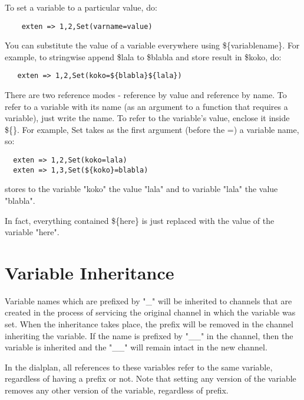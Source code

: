 To set a variable to a particular value, do:
\begin{astlisting}
\begin{verbatim}
    exten => 1,2,Set(varname=value)
\end{verbatim}
\end{astlisting}
You can substitute the value of a variable everywhere using \$\{variablename\}.
For example, to stringwise append \$lala to \$blabla and store result in \$koko,
do:
\begin{astlisting}
\begin{verbatim}
   exten => 1,2,Set(koko=${blabla}${lala})
\end{verbatim}
\end{astlisting}

There are two reference modes - reference by value and reference by name.
To refer to a variable with its name (as an argument to a function that
requires a variable), just write the name. To refer to the variable's value,
enclose it inside \$\{\}. For example, Set takes as the first argument
(before the =) a variable name, so:
\begin{astlisting}
\begin{verbatim}
  exten => 1,2,Set(koko=lala)
  exten => 1,3,Set(${koko}=blabla)
\end{verbatim}
\end{astlisting}
stores to the variable "koko" the value "lala" and to variable "lala" the
value "blabla".

In fact, everything contained \$\{here\} is just replaced with the value of
the variable "here".

\section{Variable Inheritance}

Variable names which are prefixed by "\_" will be inherited to channels
that are created in the process of servicing the original channel in
which the variable was set.  When the inheritance takes place, the
prefix will be removed in the channel inheriting the variable.  If the
name is prefixed by "\_\_" in the channel, then the variable is
inherited and the "\_\_" will remain intact in the new channel.

In the dialplan, all references to these variables refer to the same
variable, regardless of having a prefix or not.  Note that setting any
version of the variable removes any other version of the variable,
regardless of prefix.

